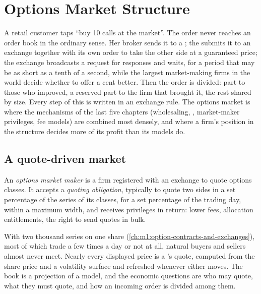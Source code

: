 \chapter{Options Market Structure}\label{ch:m1:options-market-structure}

A retail customer taps ``buy 10 calls at the market''. The order never
reaches an order book in the ordinary sense. Her broker sends it to a
; the  submits it to an exchange together with its own
order to take the other side at a guaranteed price; the exchange broadcasts a
request for responses and waits, for a period that may be as short as a
tenth of a second, while the largest market-making firms in the world decide
whether to offer a cent better. Then the order is divided: part to those who
improved, a reserved part to the firm that brought it, the rest shared by
size. Every step of this is written in an exchange rule. The options market
is where the mechanisms of the last five chapters (wholesaling, , market-maker privileges, fee models) are combined most densely,
and where a firm's position in the structure decides more of its profit than
its models do.

\section{A quote-driven market}

\begin{definition}\label{def:m1:options-market-structure:mm}
An \emph{options market maker} is a firm
registered with an exchange to quote options classes. It accepts a
\emph{quoting obligation}, typically to quote two
sides in a set percentage of the series of its classes, for a set percentage
of the trading day, within a maximum width, and receives privileges in
return: lower fees, allocation entitlements, the right to send quotes in
bulk.
\end{definition}

With two thousand series on one share (\cref{ch:m1:option-contracts-and-exchanges}),
most of which trade a few times a day or not at all, natural buyers and
sellers almost never meet. Nearly every displayed price is a 's
quote, computed from the share price and a volatility surface and refreshed
whenever either moves. The book is a projection of a model, and the economic
questions are who may quote, what they must quote, and how an incoming order
is divided among them.

